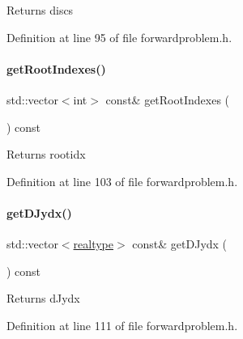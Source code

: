 \begin{DoxyReturn}{Returns}
discs 
\end{DoxyReturn}


Definition at line 95 of file forwardproblem.\+h.

\mbox{\label{classamici_1_1_forward_problem_a81f0a7c547a343c3bcd179ba5439beb3}} 
\paragraph{\texorpdfstring{getRootIndexes()}{getRootIndexes()}}
{\footnotesize\ttfamily std\+::vector$<$int$>$ const\& get\+Root\+Indexes (\begin{DoxyParamCaption}{ }\end{DoxyParamCaption}) const}

\begin{DoxyReturn}{Returns}
rootidx 
\end{DoxyReturn}


Definition at line 103 of file forwardproblem.\+h.

\mbox{\label{classamici_1_1_forward_problem_afb4ec4e3a67624dddea0cd64fca29ae9}} 
\paragraph{\texorpdfstring{getDJydx()}{getDJydx()}}
{\footnotesize\ttfamily std\+::vector$<$\mbox{\hyperlink{namespaceamici_a1bdce28051d6a53868f7ccbf5f2c14a3}{realtype}}$>$ const\& get\+D\+Jydx (\begin{DoxyParamCaption}{ }\end{DoxyParamCaption}) const}

\begin{DoxyReturn}{Returns}
d\+Jydx 
\end{DoxyReturn}


Definition at line 111 of file forwardproblem.\+h.

\mbox{\label{classamici_1_1_forward_problem_a3ea9fa40cc5f7ce1f4e1bd0a6db0f785}} 

